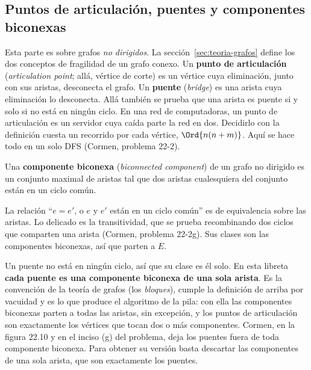 \documentclass[11pt,letterpaper]{article}
\begin{document}

\subsection*{Puntos de articulación, puentes y componentes biconexas}

Esta parte es sobre grafos \emph{no dirigidos}. La
sección~\ref{sec:teoria-grafos} define los dos conceptos de fragilidad
de un grafo conexo. Un \textbf{punto de articulación}
(\textit{articulation point}; allá, vértice de corte) es un vértice cuya
eliminación, junto con sus aristas, desconecta el grafo. Un
\textbf{puente} (\textit{bridge}) es una arista cuya eliminación lo
desconecta. Allá también se prueba que una arista es puente si y solo
si no está en ningún ciclo. En una red de computadoras, un punto de
articulación es un servidor cuya caída parte la red en dos. Decidirlo
con la definición cuesta un recorrido por cada vértice,
$\Ord{n(n + m)}$. Aquí se hace todo en un solo DFS (Cormen, problema
22-2).

\begin{definicion}
  \label{def:biconexa}
  Una \textbf{componente biconexa} (\textit{biconnected component}) de
  un grafo no dirigido es un conjunto maximal de aristas tal que dos
  aristas cualesquiera del conjunto están en un ciclo común.
\end{definicion}

La relación ``$e = e'$, o $e$ y $e'$ están en un ciclo común'' es de
equivalencia sobre las aristas. Lo delicado es la transitividad, que se
prueba recombinando dos ciclos que comparten una arista (Cormen,
problema 22-2g). Sus clases son las componentes biconexas, así que
parten a $E$.

\begin{observacion}
  Un puente no está en ningún ciclo, así que su clase es él solo. En
  esta libreta \textbf{cada puente es una componente biconexa de una
  sola arista}. Es la convención de la teoría de grafos (los
  \textit{bloques}), cumple la definición de arriba por vacuidad y es
  lo que produce el algoritmo de la pila: con ella las componentes
  biconexas parten a todas las aristas, sin excepción, y los puntos de
  articulación son exactamente los vértices que tocan dos o más
  componentes. Cormen, en la figura 22.10 y en el inciso (g) del
  problema, deja los puentes fuera de toda componente biconexa. Para
  obtener su versión basta descartar las componentes de una sola
  arista, que son exactamente los puentes.
\end{observacion}
\end{document}
